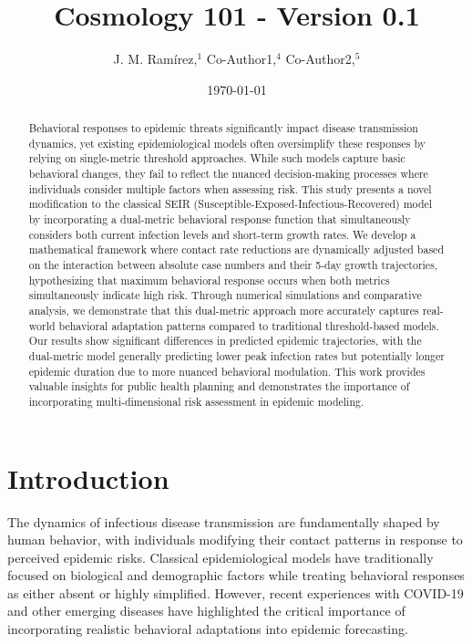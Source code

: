 \documentclass{article}\usepackage{graphicx} \usepackage{amsmath} \usepackage{colortbl}\title{Cosmology 101 - Version 0.1}
\author{J. M. Ram{\'i}rez,$^{1}$ Co-Author1,$^{4}$ Co-Author2,$^{5}$}
\date{\today}
\begin{document}
\maketitle\begin{abstract} 
Behavioral responses to epidemic threats significantly impact disease transmission dynamics, yet existing epidemiological models often oversimplify these responses by relying on single-metric threshold approaches. While such models capture basic behavioral changes, they fail to reflect the nuanced decision-making processes where individuals consider multiple factors when assessing risk.
This study presents a novel modification to the classical SEIR (Susceptible-Exposed-Infectious-Recovered) model by incorporating a dual-metric behavioral response function that simultaneously considers both current infection levels and short-term growth rates. We develop a mathematical framework where contact rate reductions are dynamically adjusted based on the interaction between absolute case numbers and their 5-day growth trajectories, hypothesizing that maximum behavioral response occurs when both metrics simultaneously indicate high risk.
Through numerical simulations and comparative analysis, we demonstrate that this dual-metric approach more accurately captures real-world behavioral adaptation patterns compared to traditional threshold-based models. Our results show significant differences in predicted epidemic trajectories, with the dual-metric model generally predicting lower peak infection rates but potentially longer epidemic duration due to more nuanced behavioral modulation. This work provides valuable insights for public health planning and demonstrates the importance of incorporating multi-dimensional risk assessment in epidemic modeling.    
\end{abstract}\section{Introduction}
The dynamics of infectious disease transmission are fundamentally shaped by human behavior, with individuals modifying their contact patterns in response to perceived epidemic risks. Classical epidemiological models have traditionally focused on biological and demographic factors while treating behavioral responses as either absent or highly simplified. However, recent experiences with COVID-19 and other emerging diseases have highlighted the critical importance of incorporating realistic behavioral adaptations into epidemic forecasting.
\end{document}
